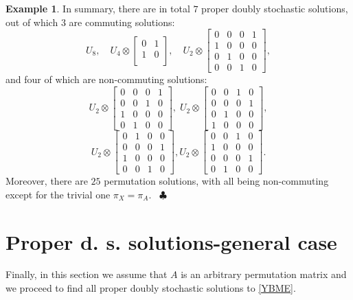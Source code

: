 \documentclass{article}
\theoremstyle{definition}\newtheorem{example}{Example}[section]
\newcommand{\mat}[4]{\left[\begin{array}{cc}#1 & #2 \\ #3 & #4 \\
	\end{array}\right]}
\begin{document}
\begin{example}
		In summary, there are in total $7$ proper doubly stochastic solutions, out of which $3$ are commuting solutions:
		$$U_8,\quad U_4\otimes\mat{0}{1}{1}{0},\quad U_2\otimes\left[\begin{array}{cccc}
			0 & 0 & 0 & 1\\
			1 & 0 & 0 & 0\\
			0 & 1 & 0 & 0\\
			0 & 0 & 1 & 0
		\end{array}\right],$$
		and four of which  are non-commuting solutions:
		$$U_2\otimes\left[\begin{array}{cccc}
			0 & 0 & 0 & 1\\
			0 & 0 & 1 & 0\\
			1 & 0 & 0 & 0\\
			0 & 1 & 0 & 0
		\end{array}\right],\;U_2\otimes\left[\begin{array}{cccc}
			0 & 0 & 1 & 0\\
			0 & 0 & 0 & 1\\
			0 & 1 & 0 & 0\\
			1 & 0 & 0 & 0
		\end{array}\right],$$
		$$U_2\otimes\left[\begin{array}{cccc}
			0 & 1 & 0 & 0\\
			0 & 0 & 0 & 1\\
			1 & 0 & 0 & 0\\
			0 & 0 & 1 & 0
		\end{array}\right],U_2\otimes\left[\begin{array}{cccc}
			0 & 0 & 1 & 0\\
			1 & 0 & 0 & 0\\
			0 & 0 & 0 & 1\\
			0 & 1 & 0 & 0
		\end{array}\right].$$
		Moreover, there are $25$ permutation solutions, with all being non-commuting except for the trivial one $\pi_X=\pi_A$. 
		\ \hfill$\clubsuit$
	\end{example}
	
	
	
	
	\section{Proper d. s. solutions-general case}\label{general}
	
	Finally, in this section we assume that $A$ is an arbitrary permutation matrix and we proceed to find all proper doubly stochastic solutions to \eqref{YBME}. 
	
\end{document}
